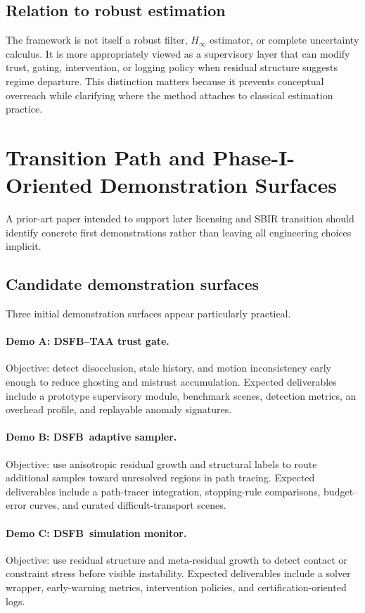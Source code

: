 \documentclass[11pt]{article}
\newcommand{\dsfb}{\textsc{DSFB}}
\theoremstyle{definition}
\theoremstyle{plain}
\begin{document}
\subsection{Relation to robust estimation}
The framework is not itself a robust filter, $H_\infty$ estimator, or complete uncertainty calculus. It is more appropriately viewed as a supervisory layer that can modify trust, gating, intervention, or logging policy when residual structure suggests regime departure. This distinction matters because it prevents conceptual overreach while clarifying where the method attaches to classical estimation practice.

\section{Transition Path and Phase-I-Oriented Demonstration Surfaces}

A prior-art paper intended to support later licensing and SBIR transition should identify concrete first demonstrations rather than leaving all engineering choices implicit.

\subsection{Candidate demonstration surfaces}
Three initial demonstration surfaces appear particularly practical.

\paragraph{Demo A: \dsfb--TAA trust gate.}
Objective: detect disocclusion, stale history, and motion inconsistency early enough to reduce ghosting and mistrust accumulation. Expected deliverables include a prototype supervisory module, benchmark scenes, detection metrics, an overhead profile, and replayable anomaly signatures.

\paragraph{Demo B: \dsfb\ adaptive sampler.}
Objective: use anisotropic residual growth and structural labels to route additional samples toward unresolved regions in path tracing. Expected deliverables include a path-tracer integration, stopping-rule comparisons, budget--error curves, and curated difficult-transport scenes.

\paragraph{Demo C: \dsfb\ simulation monitor.}
Objective: use residual structure and meta-residual growth to detect contact or constraint stress before visible instability. Expected deliverables include a solver wrapper, early-warning metrics, intervention policies, and certification-oriented logs.
\end{document}
